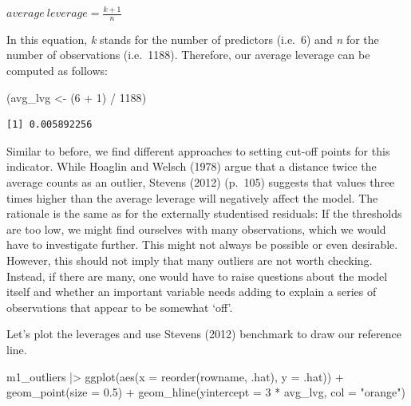 \documentclass[
  letterpaper,
]{krantz}
\makeatletter
\newenvironment{Shaded}{\begin{snugshade}}{\end{snugshade}}
\newcommand{\AttributeTok}[1]{\textcolor[rgb]{0.40,0.45,0.13}{#1}}
\newcommand{\DecValTok}[1]{\textcolor[rgb]{0.68,0.00,0.00}{#1}}
\newcommand{\FloatTok}[1]{\textcolor[rgb]{0.68,0.00,0.00}{#1}}
\newcommand{\FunctionTok}[1]{\textcolor[rgb]{0.28,0.35,0.67}{#1}}
\newcommand{\NormalTok}[1]{\textcolor[rgb]{0.00,0.23,0.31}{#1}}
\newcommand{\OtherTok}[1]{\textcolor[rgb]{0.00,0.23,0.31}{#1}}
\newcommand{\SpecialCharTok}[1]{\textcolor[rgb]{0.37,0.37,0.37}{#1}}
\newcommand{\StringTok}[1]{\textcolor[rgb]{0.13,0.47,0.30}{#1}}
\newenvironment{kframe}{%
\medskip{}
\setlength{\fboxsep}{.8em}
 \def\at@end@of@kframe{}%
 \ifinner\ifhmode%
  \def\at@end@of@kframe{\end{minipage}}%
  \begin{minipage}{\columnwidth}%
 \fi\fi%
 \def\FrameCommand##1{\hskip\@totalleftmargin \hskip-\fboxsep
 \colorbox{shadecolor}{##1}\hskip-\fboxsep
     \hskip-\linewidth \hskip-\@totalleftmargin \hskip\columnwidth}%
 \MakeFramed {\advance\hsize-\width
   \@totalleftmargin\z@ \linewidth\hsize
   \@setminipage}}%
 {\par\unskip\endMakeFramed%
 \at@end@of@kframe}
\renewenvironment{Shaded}{\begin{kframe}}{\end{kframe}}
\makeatother
\begin{document}
\label{average-leverage-equation}
\(average\ leverage = \frac{k + 1}{n}\)

In this equation, \emph{k} stands for the number of predictors (i.e.~6)
and \emph{n} for the number of observations (i.e.~1188). Therefore, our
average leverage can be computed as follows:

\begin{Shaded}
\begin{Highlighting}[]
\NormalTok{(avg\_lvg }\OtherTok{\textless{}{-}}\NormalTok{ (}\DecValTok{6} \SpecialCharTok{+} \DecValTok{1}\NormalTok{) }\SpecialCharTok{/} \DecValTok{1188}\NormalTok{)}
\end{Highlighting}
\end{Shaded}

\begin{verbatim}
[1] 0.005892256
\end{verbatim}

Similar to before, we find different approaches to setting cut-off
points for this indicator. While Hoaglin and Welsch (1978) argue that a
distance twice the average counts as an outlier, Stevens (2012) (p.~105)
suggests that values three times higher than the average leverage will
negatively affect the model. The rationale is the same as for the
externally studentised residuals: If the thresholds are too low, we
might find ourselves with many observations, which we would have to
investigate further. This might not always be possible or even
desirable. However, this should not imply that many outliers are not
worth checking. Instead, if there are many, one would have to raise
questions about the model itself and whether an important variable needs
adding to explain a series of observations that appear to be somewhat
`off'.

Let's plot the leverages and use Stevens (2012) benchmark to draw our
reference line.

\begin{Shaded}
\begin{Highlighting}[]
\NormalTok{m1\_outliers }\SpecialCharTok{|\textgreater{}}
  \FunctionTok{ggplot}\NormalTok{(}\FunctionTok{aes}\NormalTok{(}\AttributeTok{x =} \FunctionTok{reorder}\NormalTok{(rowname, .hat),}
             \AttributeTok{y =}\NormalTok{ .hat)) }\SpecialCharTok{+}
  \FunctionTok{geom\_point}\NormalTok{(}\AttributeTok{size =} \FloatTok{0.5}\NormalTok{) }\SpecialCharTok{+}
  \FunctionTok{geom\_hline}\NormalTok{(}\AttributeTok{yintercept =} \DecValTok{3} \SpecialCharTok{*}\NormalTok{ avg\_lvg, }\AttributeTok{col =} \StringTok{"orange"}\NormalTok{)}
\end{Highlighting}
\end{Shaded}
\end{document}
